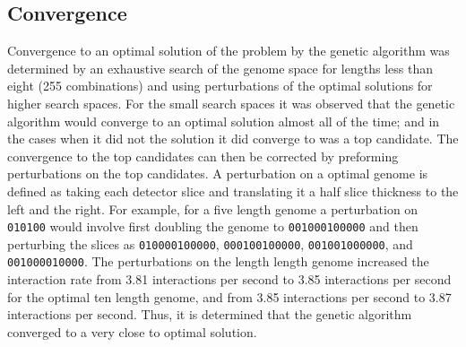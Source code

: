 \subsection{Convergence}
Convergence to an optimal solution of the problem by the genetic algorithm was determined by an exhaustive search of the genome space for lengths less than eight (255 combinations) and using perturbations of the optimal solutions for higher search spaces.
For the small search spaces it was observed that the genetic algorithm would converge to an optimal solution almost all of the time; and in the cases when it did not the solution it did converge to was a top candidate.
The convergence to the top candidates can then be corrected by preforming perturbations on the top candidates.
A perturbation on a optimal genome is defined as taking each detector slice and translating it a half slice thickness to the left and the right. 
For example, for a five length genome a perturbation on \verb+010100+ would involve first doubling the genome to  \verb+001000100000+ and then perturbing the slices as  \verb+010000100000+, \verb+000100100000+, \verb+001001000000+, and \verb+001000010000+.
The perturbations on the length length genome increased the interaction rate from 3.81 interactions per second to 3.85 interactions per second for the optimal ten length genome, and from 3.85 interactions per second to 3.87 interactions per second.
Thus, it is determined that the genetic algorithm converged to a very close to optimal solution.
